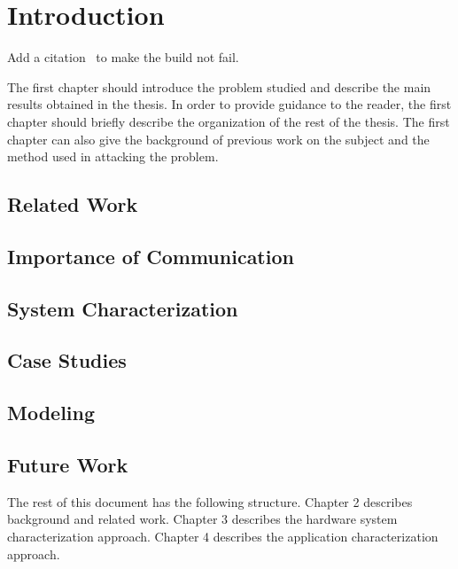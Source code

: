 
\chapter{Introduction}
Add a citation~\cite{IEEEexample:urlsty} to make the build not fail.

The first chapter should introduce the problem studied and describe the main results obtained in the thesis.
In order to provide guidance to the reader, the first chapter should briefly describe the organization of the rest of the thesis.
The first chapter can also give the background of previous work on the subject and the method used in attacking the problem.

\outline{

}

\section{Related Work}

\section{Importance of Communication}

\section{System Characterization}

\section{Case Studies}

\section{Modeling}

\section{Future Work}


The rest of this document has the following structure.
Chapter 2 describes background and related work.
Chapter 3 describes the hardware system characterization approach.
Chapter 4 describes the application characterization approach.